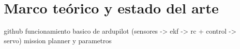 \chapter{Marco teórico y estado del arte}
github
funcionamiento basico de ardupilot (sensores -> ekf -> rc + control -> servo)
mission planner y parametros